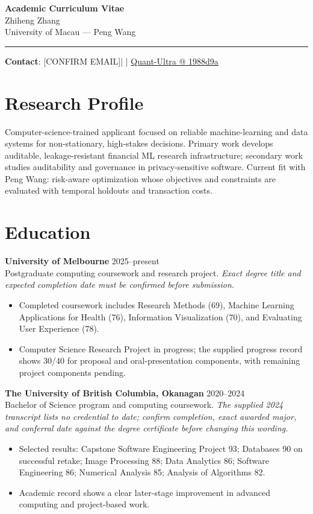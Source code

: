 \documentclass[11pt]{article}
\makeatletter
\newcommand{\ApplicantName}{Zhiheng Zhang}
\newcommand{\ApplicantEmail}{[CONFIRM EMAIL]}
\newcommand{\ApplicantPhone}{[CONFIRM PHONE]}
\newcommand{\ApplicantGitHub}{\href{https://github.com/zhiheng-zhang-Mera/Quant-Ultra/tree/1988d9a8530da91a8158de864d098ea869098923}{Quant-Ultra @ 1988d9a}}
\makeatother
\begin{document}
\begin{center}
{\LARGE\bfseries Academic Curriculum Vitae}\\[0.25em]
{\large \ApplicantName}\\
University of Macau --- Peng Wang
\end{center}
\vspace{0.35em}\hrule\vspace{0.65em}

\textbf{Contact}: \ApplicantEmail\quad | \quad \ApplicantPhone\quad | \quad \ApplicantGitHub

\section*{Research Profile}
Computer-science-trained applicant focused on reliable machine-learning and data systems for non-stationary, high-stakes decisions. Primary work develops auditable, leakage-resistant financial ML research infrastructure; secondary work studies auditability and governance in privacy-sensitive software. Current fit with Peng Wang: risk-aware optimization whose objectives and constraints are evaluated with temporal holdouts and transaction costs.

\section*{Education}
\textbf{University of Melbourne} \hfill 2025--present\\
Postgraduate computing coursework and research project. \textit{Exact degree title and expected completion date must be confirmed before submission.}
\begin{itemize}
\item Completed coursework includes Research Methods (69), Machine Learning Applications for Health (76), Information Visualization (70), and Evaluating User Experience (78).
\item Computer Science Research Project in progress; the supplied progress record shows 30/40 for proposal and oral-presentation components, with remaining project components pending.
\end{itemize}

\textbf{The University of British Columbia, Okanagan} \hfill 2020--2024\\
Bachelor of Science program and computing coursework. \textit{The supplied 2024 transcript lists no credential to date; confirm completion, exact awarded major, and conferral date against the degree certificate before changing this wording.}
\begin{itemize}
\item Selected results: Capstone Software Engineering Project 93; Databases 90 on successful retake; Image Processing 88; Data Analytics 86; Software Engineering 86; Numerical Analysis 85; Analysis of Algorithms 82.
\item Academic record shows a clear later-stage improvement in advanced computing and project-based work.
\end{itemize}
\end{document}
